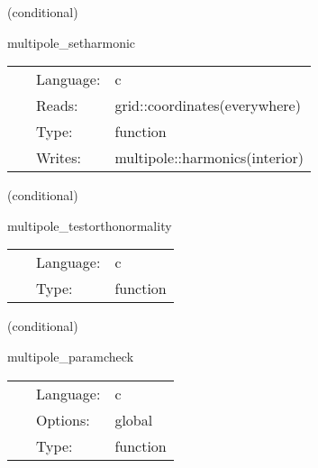 \vspace{5mm}

   (conditional) 

\hspace{5mm} multipole\_setharmonic 

\hspace{5mm}{\it populate grid functions with spherical harmonics } 


\hspace{5mm}

 \begin{tabular*}{160mm}{cll} 
~ & Language:  & c \\ 
~ & Reads:  & grid::coordinates(everywhere) \\ 
~ & Type:  & function \\ 
~ & Writes:  & multipole::harmonics(interior) \\ 
\end{tabular*} 


\vspace{5mm}

   (conditional) 

\hspace{5mm} multipole\_testorthonormality 

\hspace{5mm}{\it loop over modes and integrate them to check orthonormality } 


\hspace{5mm}

 \begin{tabular*}{160mm}{cll} 
~ & Language:  & c \\ 
~ & Type:  & function \\ 
\end{tabular*} 


\vspace{5mm}

   (conditional) 

\hspace{5mm} multipole\_paramcheck 

\hspace{5mm}{\it check multipole parameters } 


\hspace{5mm}

 \begin{tabular*}{160mm}{cll} 
~ & Language:  & c \\ 
~ & Options:  & global \\ 
~ & Type:  & function \\ 
\end{tabular*} 


